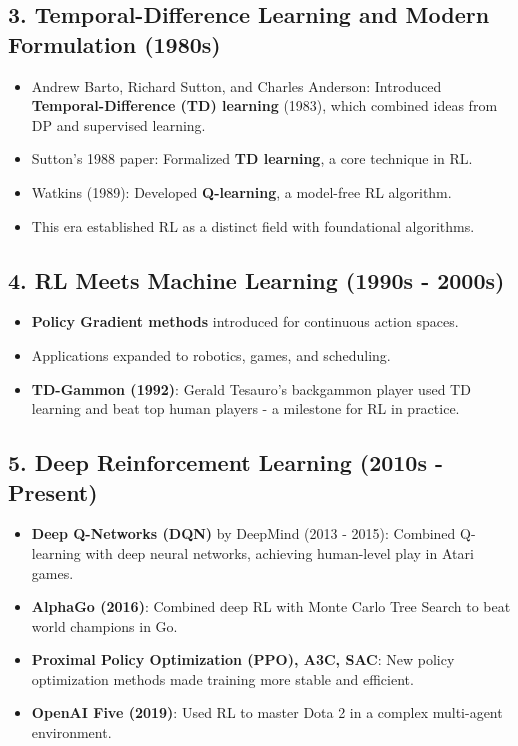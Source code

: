 \documentclass[10pt]{article}
\begin{document}
\subsection*{3. Temporal-Difference Learning and Modern Formulation (1980s)}
\begin{itemize}
	\item Andrew Barto, Richard Sutton, and Charles Anderson: Introduced \textbf{Temporal-Difference (TD) learning} (1983), which combined ideas from DP and supervised learning.
	\item Sutton's 1988 paper: Formalized \textbf{TD learning}, a core technique in RL.
	\item Watkins (1989): Developed \textbf{Q-learning}, a model-free RL algorithm.
	\item This era established RL as a distinct field with foundational algorithms.
\end{itemize}

\subsection*{4. RL Meets Machine Learning (1990s - 2000s)}
\begin{itemize}
	\item \textbf{Policy Gradient methods} introduced for continuous action spaces.
	\item Applications expanded to robotics, games, and scheduling.
	\item \textbf{TD-Gammon (1992)}: Gerald Tesauro's backgammon player used TD learning and beat top human players - a milestone for RL in practice.
\end{itemize}

\subsection*{5. Deep Reinforcement Learning (2010s - Present)}
\begin{itemize}
	\item \textbf{Deep Q-Networks (DQN)} by DeepMind (2013 - 2015): Combined Q-learning with deep neural networks, achieving human-level play in Atari games.
	\item \textbf{AlphaGo (2016)}: Combined deep RL with Monte Carlo Tree Search to beat world champions in Go.
	\item \textbf{Proximal Policy Optimization (PPO), A3C, SAC}: New policy optimization methods made training more stable and efficient.
	\item \textbf{OpenAI Five (2019)}: Used RL to master Dota 2 in a complex multi-agent environment.
\end{itemize}
\end{document}
